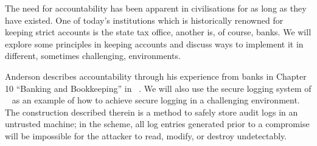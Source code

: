 The need for accountability has been apparent in civilisations for as long as 
they have existed.
One of today's institutions which is historically renowned for keeping strict 
accounts is the state tax office, another is, of course, banks.
We will explore some principles in keeping accounts and discuss ways to 
implement it in different, sometimes challenging, environments.

Anderson describes accountability through his experience from banks in Chapter 
10 \enquote{Banking and Bookkeeping} in 
~\cite{Anderson2008sea}.
We will also use the secure logging system of 
\citeauthor{schneier1999secure}~\cite{schneier1999secure} as an example of how 
to achieve secure logging in a challenging environment.
The construction described therein is a method to safely store audit logs in an 
untrusted machine; in the scheme, all log entries generated prior to 
a compromise will be impossible for the attacker to read, modify, or destroy 
undetectably.

